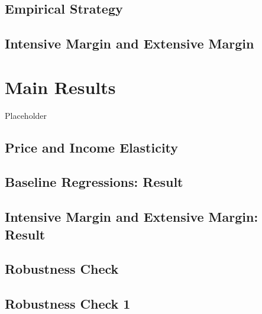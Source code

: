 \documentclass[ review  , 3p ]{elsarticle}
\begin{document}
  \hypertarget{empirical-strategy}{%
  \subsection{Empirical Strategy}\label{empirical-strategy}}
  
  \hypertarget{intensive-margin-and-extensive-margin}{%
  \subsection{Intensive Margin and Extensive Margin}\label{intensive-margin-and-extensive-margin}}
  
  \hypertarget{main-results}{%
  \section{Main Results}\label{main-results}}
  
  Placeholder
  
  \hypertarget{price-and-income-elasticity}{%
  \subsection{Price and Income Elasticity}\label{price-and-income-elasticity}}
  
  \hypertarget{baseline-regressions-result}{%
  \subsection{Baseline Regressions: Result}\label{baseline-regressions-result}}
  
  \hypertarget{intensive-margin-and-extensive-margin-result}{%
  \subsection{Intensive Margin and Extensive Margin: Result}\label{intensive-margin-and-extensive-margin-result}}
  
  \hypertarget{robustness-check}{%
  \subsection{Robustness Check}\label{robustness-check}}
  
  \hypertarget{robustness-check-1}{%
  \subsection{Robustness Check 1}\label{robustness-check-1}}
  
\end{document}
